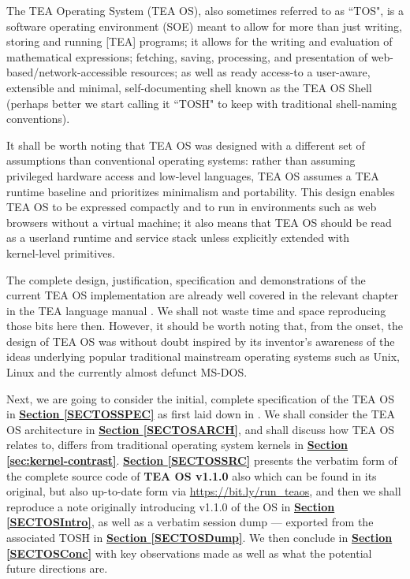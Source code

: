 \documentclass{article}
\begin{document}
The TEA Operating System (TEA OS), also sometimes referred to as ``TOS", is a software operating environment (SOE) \cite{lutalo2023dnapsoe} meant to allow for more than just writing, storing and running [TEA] programs; it allows for the writing and evaluation of mathematical expressions; fetching, saving, processing, and presentation of web-based/network-accessible resources; as well as ready access-to a user-aware, extensible and minimal, self-documenting shell known as the TEA OS Shell (perhaps better we start calling it ``TOSH" to keep with traditional shell-naming conventions). 

It shall be worth noting that TEA OS was designed with a different set of assumptions than conventional operating systems: rather than assuming privileged hardware access and low‑level languages, TEA OS assumes a TEA runtime baseline and prioritizes minimalism and portability.  This design enables TEA OS to be expressed compactly and to run in environments such as web browsers without a virtual machine; it also means that TEA OS should be read as a userland runtime and service stack unless explicitly extended with kernel‑level primitives.

The complete design, justification, specification and demonstrations of the current TEA OS implementation are already well covered in the relevant chapter in the TEA language manual \cite{Lutalo2024TEATAZ}. We shall not waste time and space reproducing those bits here then. However, it should be worth noting that, from the onset, the design of TEA OS was without doubt inspired by its inventor's awareness of the ideas underlying popular traditional mainstream operating systems such as Unix, Linux and the currently almost defunct MS-DOS.

Next, we are going to consider the initial, complete specification of the TEA OS in \textbf{\hyperref[SECTOSSPEC]{Section \ref{SECTOSSPEC}}} as first laid down in \cite{Lutalo2024TEATAZ}. We shall consider the TEA OS architecture in \textbf{\hyperref[SECTOSARCH]{Section \ref{SECTOSARCH}}}, and shall discuss how TEA OS relates to, differs from traditional operating system kernels in \textbf{\hyperref[sec:kernel-contrast]{Section \ref{sec:kernel-contrast}}}. \textbf{\hyperref[SECTOSSRC]{Section \ref{SECTOSSRC}}} presents the verbatim form of the complete source code of \textbf{TEA OS v1.1.0} also which can be found in its original, but also up-to-date form via \url{https://bit.ly/run_teaos}, and then we shall reproduce a note originally introducing v1.1.0 of the OS in \textbf{\hyperref[SECTOSIntro]{Section \ref{SECTOSIntro}}}, as well as a verbatim session dump --- exported from the associated TOSH in \textbf{\hyperref[SECTOSDump]{Section \ref{SECTOSDump}}}. We then conclude in \textbf{\hyperref[SECTOSConc]{Section \ref{SECTOSConc}}} with key observations made as well as what the potential future directions are.
\end{document}
